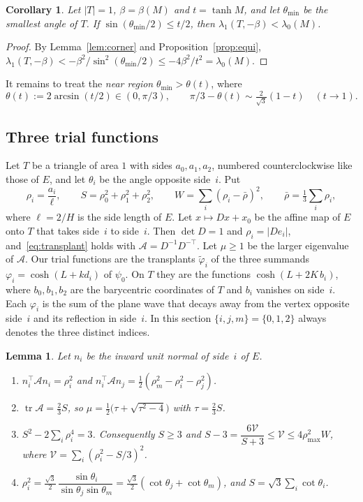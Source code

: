 \documentclass[11pt]{article}
\newtheorem{lemma}[theorem]{Lemma}
\newtheorem{corollary}[theorem]{Corollary}
\theoremstyle{remark}
\newcommand{\E}{E}
\DeclareMathOperator{\tr}{tr}
\begin{document}
\begin{corollary}\label{cor:far}
Let $|T|=1$, $\beta=\beta(M)$ and $t=\tanh M$, and let $\theta_{\min}$ be the smallest angle of $T$. If
$\sin(\theta_{\min}/2)\le t/2$, then $\lambda_1(T,-\beta)<\lambda_0(M)$.
\end{corollary}

\begin{proof}
By Lemma~\ref{lem:corner} and Proposition~\ref{prop:equi},
$\lambda_1(T,-\beta)<-\beta^2/\sin^2(\theta_{\min}/2)\le-4\beta^2/t^2=\lambda_0(M)$.
\end{proof}

It remains to treat the \emph{near region} $\theta_{\min}>\theta(t)$, where
\begin{equation}\label{eq:near}
  \theta(t):=2\arcsin(t/2)\in(0,\pi/3),\qquad \pi/3-\theta(t)\sim\tfrac{2}{\sqrt3}(1-t)\quad(t\to1).
\end{equation}

\subsection{Three trial functions}

Let $T$ be a triangle of area $1$ with sides $a_0,a_1,a_2$, numbered counterclockwise like those of $\E$,
and let $\theta_i$ be the angle opposite side~$i$. Put
\[
  \rho_i=\frac{a_i}{\ell},\qquad S=\rho_0^2+\rho_1^2+\rho_2^2,\qquad
  W=\sum_i(\rho_i-\bar\rho)^2,\qquad \bar\rho=\tfrac13\sum_i\rho_i ,
\]
where $\ell=2/H$ is the side length of $\E$. Let $x\mapsto Dx+x_0$ be the affine map of $\E$ onto $T$ that
takes side~$i$ to side~$i$. Then $\det D=1$ and $\rho_i=|De_i|$, and~\eqref{eq:transplant} holds with
$\mathcal A=D^{-1}D^{-\top}$. Let $\mu\ge1$ be the larger eigenvalue of $\mathcal A$. Our trial functions
are the transplants $\tilde\varphi_i$ of the three summands $\varphi_i=\cosh(L+kd_i)$ of $\psi_0$. On $T$
they are the functions $\cosh(L+2K\,b_i)$, where $b_0,b_1,b_2$ are the barycentric coordinates of $T$
and $b_i$ vanishes on side~$i$. Each $\varphi_i$ is the sum of the plane wave that decays away from the
vertex opposite side~$i$ and its reflection in side~$i$. In this section $\{i,j,m\}=\{0,1,2\}$ always
denotes the three distinct indices.

\begin{lemma}\label{lem:rho}
Let $n_i$ be the inward unit normal of side~$i$ of $\E$.
\begin{enumerate}
\item[(a)] $n_i^\top\mathcal An_i=\rho_i^2$ and $n_i^\top\mathcal An_j=\frac12(\rho_m^2-\rho_i^2-\rho_j^2)$.
\item[(b)] $\tr\mathcal A=\frac23S$, so $\mu=\frac12\bigl(\tau+\sqrt{\tau^2-4}\bigr)$ with $\tau=\frac23S$.
\item[(c)] $S^2-2\sum_i\rho_i^4=3$. Consequently $S\ge3$ and
$S-3=\dfrac{6\mathcal V}{S+3}\le\mathcal V\le4\rho_{\max}^2W$, where $\mathcal V=\sum_i(\rho_i^2-S/3)^2$.
\item[(d)] $\rho_i^2=\frac{\sqrt3}{2}\,\dfrac{\sin\theta_i}{\sin\theta_j\sin\theta_m}
=\frac{\sqrt3}{2}(\cot\theta_j+\cot\theta_m)$, and $S=\sqrt3\sum_i\cot\theta_i$.
\end{enumerate}
\end{lemma}
\end{document}
